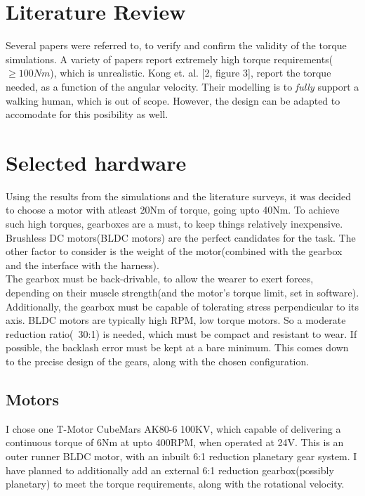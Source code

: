 \documentclass[a4paper]{article}
\begin{document}
	\section{Literature Review}
		Several papers were referred to, to verify and confirm the validity of the torque simulations. A variety of papers report extremely high torque requirements($\ge100Nm$), which is unrealistic. Kong et. al. [2, figure 3], report the torque needed, as a function of the angular velocity. Their modelling is to \textit{fully} support a walking human, which is out of scope. However, the design can be adapted to accomodate for this posibility as well.

	\section{Selected hardware}
		Using the results from the simulations and the literature surveys, it was decided to choose a motor with atleast 20Nm of torque, going upto 40Nm. To achieve such high torques, gearboxes are a must, to keep things relatively inexpensive. Brushless DC motors(BLDC motors) are the perfect candidates for the task. The other factor to consider is the weight of the motor(combined with the gearbox and the interface with the harness).\\

		The gearbox must be back-drivable, to allow the wearer to exert forces, depending on their muscle strength(and the motor's torque limit, set in software). Additionally, the gearbox must be capable of tolerating stress perpendicular to its axis. BLDC motors are typically high RPM, low torque motors. So a moderate reduction ratio(~30:1) is needed, which must be compact and resistant to wear. If possible, the backlash error must be kept at a bare minimum. This comes down to the precise design of the gears, along with the chosen configuration.\\

		\subsection{Motors}
			I chose one T-Motor CubeMars AK80-6 100KV, which capable of delivering a continuous torque of 6Nm at upto 400RPM, when operated at 24V. This is an outer runner BLDC motor, with an inbuilt 6:1 reduction planetary gear system. I have planned to additionally add an external 6:1 reduction gearbox(possibly planetary) to meet the torque requirements, along with the rotational velocity.\\
\end{document}
